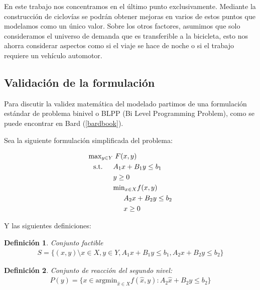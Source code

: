 \documentclass{article}
\newtheorem{definition}{Definición}
\newcommand{\modelspace}{\hspace{1.5em}}
\begin{document}
  En este trabajo nos concentramos en el último punto exclusivamente. Mediante la construcción de ciclovías se podrán obtener mejoras en varios de estos puntos que modelamos como un único valor. Sobre los otros factores, asumimos que solo consideramos el universo de demanda que es transferible a la bicicleta, esto nos ahorra considerar aspectos como si el viaje se hace de noche o si el trabajo requiere un vehículo automotor.

  \subsection{Validación de la formulación}

  Para discutir la validez matemática del modelado partimos de una formulación estándar de problema binivel o BLPP (Bi Level Programming Problem), como se puede encontrar en Bard (\ref{bardbook}).

  Sea la siguiente formulación simplificada del problema:

  \begin{align}
    \text{max}_{y \in Y}    & \; F(x, y) \label{bilevelgeneric1} \\
    \text{s.t.} \modelspace & A_1 x + B_1 y \leq b_1 \\
                            & y \geq 0 \\
                            & \text{min}_{x \in X} f(x, y) \\
                            & \modelspace A_2 x + B_2 y \leq b_2 \label{bilevelgeneric5} \\
                            & \modelspace x \geq 0 \label{bilevelgeneric6}
  \end{align}

  Y las siguientes definiciones:

  \begin{definition}
    Conjunto factible
    \begin{align}
      S = \{(x, y) \setminus x \in X, y \in Y, A_1 x + B_1 y \leq b_1, A_2 x + B_2 y \leq b_2 \}
    \end{align}
  \end{definition}

  \begin{definition}
    Conjunto de reacción del segundo nivel:
    \begin{align}
      P(y) = \{ x \in \text{argmin}_{\hat{x} \in X} f(\hat{x}, y) : A_2 \hat{x} + B_2 y \leq b_2 \}
    \end{align}
  \end{definition}
\end{document}
